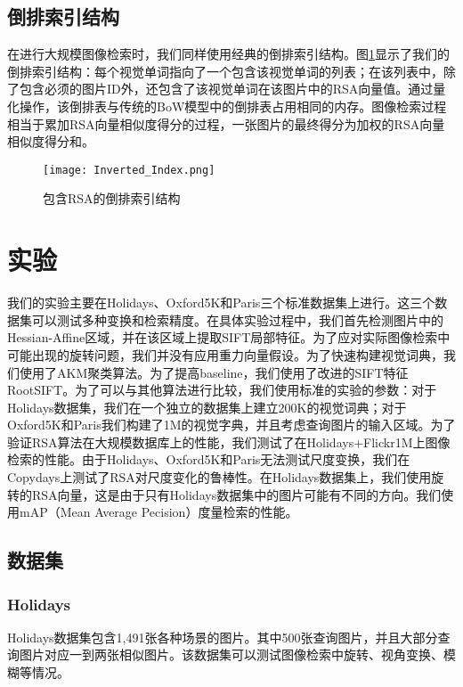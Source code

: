 \subsection{倒排索引结构}
在进行大规模图像检索时，我们同样使用经典的倒排索引结构。图\ref{fig:ii}显示了我们的倒排索引结构：每个视觉单词指向了一个包含该视觉单词的列表；在该列表中，除了包含必须的图片ID外，还包含了该视觉单词在该图片中的RSA向量值。通过量化操作，该倒排表与传统的BoW模型中的倒排表占用相同的内存。图像检索过程相当于累加RSA向量相似度得分的过程，一张图片的最终得分为加权的RSA向量相似度得分和。
\begin{figure}[h]
	\centering
	\texttt{[image: Inverted\_Index.png]}
	\caption{包含RSA的倒排索引结构}\label{fig:ii}
\end{figure}


\section{实验}
我们的实验主要在Holidays\cite{jegou2008hamming}、Oxford5K\cite{philbin2007object}和Paris\cite{philbin2008lost}三个标准数据集上进行。这三个数据集可以测试多种变换和检索精度。在具体实验过程中，我们首先检测图片中的Hessian-Affine区域\cite{mikolajczyk2004scale}，并在该区域上提取SIFT局部特征\cite{lowe2004distinctive}。为了应对实际图像检索中可能出现的旋转问题，我们并没有应用重力向量假设\cite{perd2009efficient}。为了快速构建视觉词典，我们使用了AKM\cite{philbin2007object}聚类算法。为了提高baseline，我们使用了改进的SIFT特征RootSIFT\cite{arandjelovic2012three}。为了可以与其他算法进行比较，我们使用标准的实验的参数：对于Holidays数据集，我们在一个独立的数据集上建立200K的视觉词典；对于Oxford5K和Paris我们构建了1M的视觉字典，并且考虑查询图片的输入区域。为了验证RSA算法在大规模数据库上的性能，我们测试了在Holidays+Flickr1M\cite{philbin2007object}上图像检索的性能。由于Holidays、Oxford5K和Paris无法测试尺度变换，我们在Copydays\cite{douze2009evaluation}上测试了RSA对尺度变化的鲁棒性。在Holidays数据集上，我们使用旋转的RSA向量，这是由于只有Holidays数据集中的图片可能有不同的方向。我们使用mAP（Mean Average  Pecision）度量检索的性能。

\subsection{数据集}

\subsubsection{Holidays}
Holidays数据集包含1,491张各种场景的图片。其中500张查询图片，并且大部分查询图片对应一到两张相似图片。该数据集可以测试图像检索中旋转、视角变换、模糊等情况。

